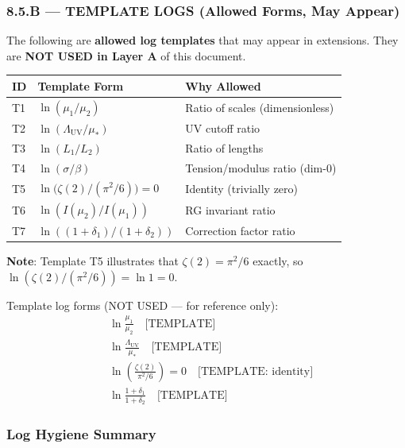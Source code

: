 \documentclass[11pt,a4paper]{article}
\begin{document}
\subsubsection{8.5.B --- TEMPLATE LOGS (Allowed Forms, May Appear)}
\label{subsubsec:template-logs}

The following are \textbf{allowed log templates} that may appear in extensions. They are \textbf{NOT USED in Layer A} of this document.

\begin{center}
\begin{tabular}{lll}
\toprule
\textbf{ID} & \textbf{Template Form} & \textbf{Why Allowed} \\
\midrule
T1 & $\ln(\mu_1/\mu_2)$ & Ratio of scales (dimensionless) \\
T2 & $\ln(\Lambda_{\text{UV}}/\mu_*)$ & UV cutoff ratio \\
T3 & $\ln(L_1/L_2)$ & Ratio of lengths \\
T4 & $\ln(\sigma/\beta)$ & Tension/modulus ratio (dim-0) \\
T5 & $\ln\bigl(\zeta(2)/(\pi^2/6)\bigr) = 0$ & Identity (trivially zero) \\
T6 & $\ln(I(\mu_2)/I(\mu_1))$ & RG invariant ratio \\
T7 & $\ln((1+\delta_1)/(1+\delta_2))$ & Correction factor ratio \\
\bottomrule
\end{tabular}
\end{center}

\textbf{Note}: Template T5 illustrates that $\zeta(2) = \pi^2/6$ exactly, so $\ln(\zeta(2)/(\pi^2/6)) = \ln 1 = 0$.

Template log forms (NOT USED --- for reference only):
\begin{align}
\label{eq:log-tmpl-1} &\ln\frac{\mu_1}{\mu_2} \quad \text{[TEMPLATE]} \\
\label{eq:log-tmpl-2} &\ln\frac{\Lambda_{\text{UV}}}{\mu_*} \quad \text{[TEMPLATE]} \\
\label{eq:log-tmpl-3} &\ln\left(\frac{\zeta(2)}{\pi^2/6}\right) = 0 \quad \text{[TEMPLATE: identity]} \\
\label{eq:log-tmpl-4} &\ln\frac{1 + \delta_1}{1 + \delta_2} \quad \text{[TEMPLATE]}
\end{align}

\subsubsection{Log Hygiene Summary}
\label{subsubsec:log-summary}
\end{document}
